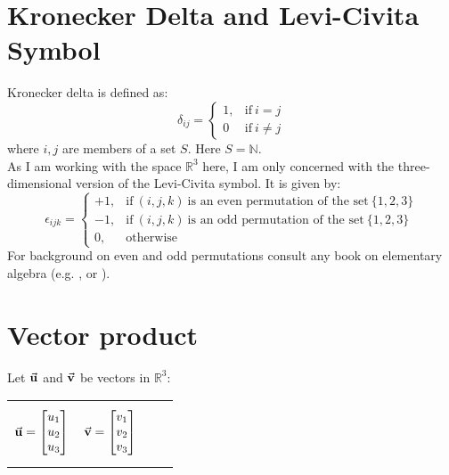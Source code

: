 \documentclass[12pt]{article}
\begin{document}
\section{Kronecker Delta and Levi-Civita Symbol}
Kronecker delta is defined as:
\begin{equation}
\label{kronecker_delta_definition}
\delta_{ij} = 
\begin{cases}
1, & \text{if}\ i = j \\
0 & \text{if}\ i \neq j
\end{cases}
\end{equation}
where $i, j$ are members of a set $S$. Here $S = \mathbb{N}$.
\\ \indent As I am working with the space $\mathbb{R}^3$ here, I am only
concerned with the three-dimensional version of the Levi-Civita symbol.
It is given by:
\begin{equation}
\label{levi_civita_symbol_definition}
\epsilon_{ijk} = 
\begin{cases}
+1, & \text{if}\ (i, j, k)\ \text{is an even permutation of the set}\ \{1, 2, 3\} \\
-1, & \text{if}\ (i, j, k)\ \text{is an odd permutation of the set}\ \{1, 2, 3\} \\
0, & \text{otherwise}
\end{cases}
\end{equation}
For background on even and odd permutations consult any book on elementary
algebra (e.g. \cite{algebra1_kostrikin}, \cite{hungerford_algebra} or
\cite{pinter_abstract_algebra}).


\section{Vector product}
Let $\va{u}$ and $\va{v}$ be vectors in $\mathbb{R}^3$: 

\noindent
\begin{tabularx}{\linewidth}{@{}XX@{}XX@{}}
\begin{equation*}
\va{u} = 
\begin{bmatrix}
u_1 \\ u_2 \\ u_3
\end{bmatrix}
\end{equation*}
&
\begin{equation*}
\va{v} = 
\begin{bmatrix}
v_1 \\ v_2 \\ v_3
\end{bmatrix}
\end{equation*} 
\end{tabularx}
\end{document}
